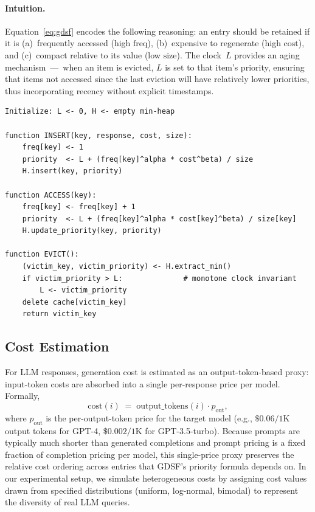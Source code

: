\documentclass[sigconf, nonacm, review=false, screen=true]{acmart}
\begin{document}
\paragraph{Intuition.}
Equation~\eqref{eq:gdsf} encodes the following reasoning: an entry should
be retained if it is (a)~frequently accessed (high $\text{freq}$),
(b)~expensive to regenerate (high $\text{cost}$), and (c)~compact relative
to its value (low $\text{size}$). The clock~$L$ provides an aging
mechanism~---~when an item is evicted, $L$ is set to that item's priority,
ensuring that items not accessed since the last eviction will have
relatively lower priorities, thus incorporating recency without explicit
timestamps.

\begin{lstlisting}[caption={GDSF eviction for LLM cache (pseudocode).}, label=lst:gdsf-pseudo]
Initialize: L <- 0, H <- empty min-heap

function INSERT(key, response, cost, size):
    freq[key] <- 1
    priority  <- L + (freq[key]^alpha * cost^beta) / size
    H.insert(key, priority)

function ACCESS(key):
    freq[key] <- freq[key] + 1
    priority  <- L + (freq[key]^alpha * cost[key]^beta) / size[key]
    H.update_priority(key, priority)

function EVICT():
    (victim_key, victim_priority) <- H.extract_min()
    if victim_priority > L:              # monotone clock invariant
        L <- victim_priority
    delete cache[victim_key]
    return victim_key
\end{lstlisting}

\subsection{Cost Estimation}
For LLM responses, generation cost is estimated as an output-token-based
proxy: input-token costs are absorbed into a single per-response price
per model. Formally,
\begin{equation}
  \text{cost}(i) \;=\; \text{output\_tokens}(i) \cdot p_{\text{out}},
  \label{eq:cost}
\end{equation}
where $p_{\text{out}}$ is the per-output-token price for the target
model (e.g., $\$0.06/\text{1K}$ output tokens for GPT-4, $\$0.002/\text{1K}$
for GPT-3.5-turbo). Because prompts are typically much shorter than
generated completions and prompt pricing is a fixed fraction of completion
pricing per model, this single-price proxy preserves the relative cost
ordering across entries that GDSF's priority formula depends on. In our
experimental setup, we simulate heterogeneous costs by assigning cost
values drawn from specified distributions (uniform, log-normal, bimodal)
to represent the diversity of real LLM queries.
\end{document}
